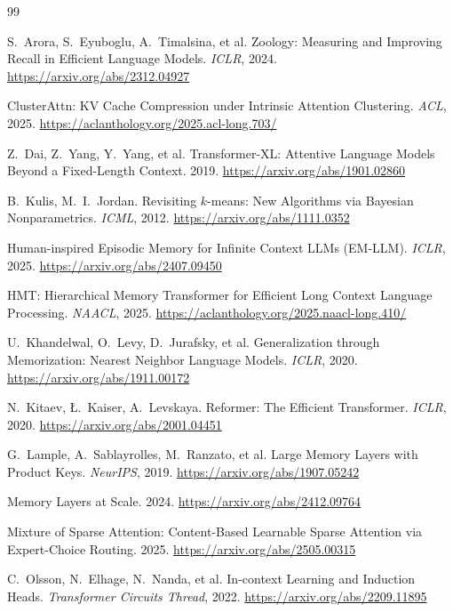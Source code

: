 \documentclass[11pt]{article}
\begin{document}
\begin{thebibliography}{99}

 S.~Arora, S.~Eyuboglu, A.~Timalsina, et al.
Zoology: Measuring and Improving Recall in Efficient Language Models. \emph{ICLR}, 2024.
\url{https://arxiv.org/abs/2312.04927}

 ClusterAttn: KV Cache Compression under Intrinsic
Attention Clustering. \emph{ACL}, 2025. \url{https://aclanthology.org/2025.acl-long.703/}

 Z.~Dai, Z.~Yang, Y.~Yang, et al. Transformer-XL:
Attentive Language Models Beyond a Fixed-Length Context. 2019.
\url{https://arxiv.org/abs/1901.02860}

 B.~Kulis, M.~I.~Jordan. Revisiting $k$-means: New
Algorithms via Bayesian Nonparametrics. \emph{ICML}, 2012.
\url{https://arxiv.org/abs/1111.0352}

 Human-inspired Episodic Memory for Infinite Context LLMs
(EM-LLM). \emph{ICLR}, 2025. \url{https://arxiv.org/abs/2407.09450}

 HMT: Hierarchical Memory Transformer for Efficient Long
Context Language Processing. \emph{NAACL}, 2025.
\url{https://aclanthology.org/2025.naacl-long.410/}

 U.~Khandelwal, O.~Levy, D.~Jurafsky, et al.
Generalization through Memorization: Nearest Neighbor Language Models. \emph{ICLR}, 2020.
\url{https://arxiv.org/abs/1911.00172}

 N.~Kitaev, {\L}.~Kaiser, A.~Levskaya. Reformer:
The Efficient Transformer. \emph{ICLR}, 2020. \url{https://arxiv.org/abs/2001.04451}

 G.~Lample, A.~Sablayrolles, M.~Ranzato, et al.
Large Memory Layers with Product Keys. \emph{NeurIPS}, 2019.
\url{https://arxiv.org/abs/1907.05242}

 Memory Layers at Scale. 2024.
\url{https://arxiv.org/abs/2412.09764}

 Mixture of Sparse Attention: Content-Based Learnable Sparse
Attention via Expert-Choice Routing. 2025. \url{https://arxiv.org/abs/2505.00315}

 C.~Olsson, N.~Elhage, N.~Nanda, et al.
In-context Learning and Induction Heads. \emph{Transformer Circuits Thread}, 2022.
\url{https://arxiv.org/abs/2209.11895}


\end{thebibliography}
\end{document}
